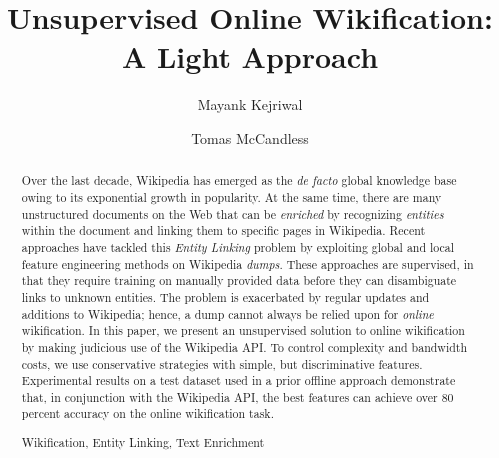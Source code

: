 \documentclass[runningheads,a4paper]{llncs}
\newcommand{\keywords}[1]{\par\addvspace\baselineskip
\noindent\keywordname\enspace\ignorespaces#1}
\begin{document}
\mainmatter  %

\title{Unsupervised Online Wikification: A Light Approach}

%
%
\author{Mayank Kejriwal%
\and Tomas McCandless}


%
%

\maketitle

\begin{abstract}
Over the last decade, Wikipedia has emerged as the \emph{de facto} global knowledge base owing to its exponential growth in popularity. At the same time, there are many unstructured documents on the Web that can be \emph{enriched} by recognizing \emph{entities} within the document and linking them to specific pages in Wikipedia. Recent approaches have tackled this \emph{Entity Linking} problem by exploiting global and local feature engineering methods on Wikipedia \emph{dumps}. These approaches are supervised, in that they require training on manually provided data before they can disambiguate links to unknown entities. The problem is exacerbated by regular updates and additions to Wikipedia; hence, a dump cannot always be relied upon for \emph{online} wikification. In this paper, we present an unsupervised solution to online wikification by making judicious use of the Wikipedia API. To control complexity and bandwidth costs, we use conservative strategies with simple, but discriminative features. Experimental results on a test dataset used in a prior offline approach demonstrate that, in conjunction with the Wikipedia API, the best features can achieve over 80 percent accuracy on the online wikification task.  
\keywords{Wikification, Entity Linking, Text Enrichment}

\end{abstract}
\end{document}
